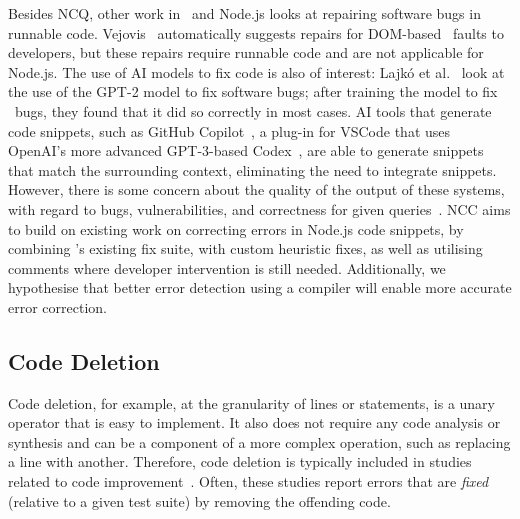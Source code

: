 \documentclass[conference]{IEEEtran}
\begin{document}
Besides NCQ, other work in \js\ and Node.js looks at repairing software bugs in runnable code. Vejovis~\cite{ocariza2014vejovis} automatically suggests repairs for DOM-based \js\ faults to developers, but these repairs require runnable code and are not applicable for Node.js. The use of AI models to fix code is also of interest: Lajkó et al.~\cite{lajko2022towards} look at the use of the GPT-2 model to fix software bugs; after training the model to fix \js\ bugs, they found that it did so correctly in most cases. AI tools that generate code snippets, such as GitHub Copilot~\cite{copilot}, a plug-in for VSCode that uses OpenAI's more advanced GPT-3-based Codex~\cite{codex}, are able to generate snippets that match the surrounding context, eliminating the need to integrate snippets. However, there is some concern about the quality of the output of these systems, with regard to bugs, vulnerabilities, and correctness for given queries~\cite{dakhel2022github, nguyen2022empirical}. NCC aims to build on existing work on correcting errors in Node.js code snippets, by combining \ts{}'s existing fix suite, with custom heuristic fixes, as well as utilising comments where developer intervention is still needed. Additionally, we hypothesise that better error detection using a compiler will enable more accurate error correction.




\subsection{Code Deletion}
Code deletion, for example, at the granularity of lines or statements, is a unary operator that is easy to implement. It also does not require any code analysis or synthesis and can be a component of a more complex operation, such as replacing a line with another. Therefore, code deletion is typically included in studies related to code improvement~\cite{legoues2012operators,harrand2019neutralvariants,10.1145/3520304.3533970,10.1145/3520304.3528772, petke2019survey, ginelli2022deletions}. Often, these studies report errors that are \textit{fixed} (relative to a given test suite) by removing the offending code. 
\end{document}
